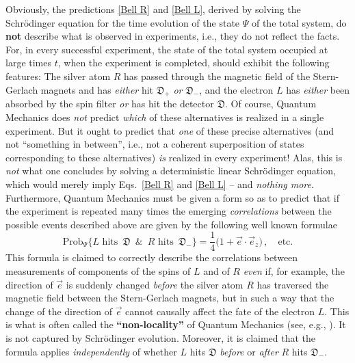 \documentclass[12pt]{article}
\begin{document}
{{Obviously}}, the predictions \eqref{Bell R} and \eqref{Bell L}, derived by solving the Schr\"odinger equation for
the time evolution of the state $\Psi$ of the total system, do {\bf{not}} describe what is observed in experiments, i.e.,
they do not reflect the facts. For, in every successful experiment, the state of the total system occupied at large times
$t$, when the experiment is completed, should exhibit the following features:
The silver atom $R$ has passed through the magnetic field of the Stern-Gerlach magnets and has \textit{either} hit
$\mathfrak{D}_{+}$ \textit{or} $\mathfrak{D}_{-}$, and the electron $L$ has \textit{either} been absorbed by the
spin filter \textit{or} has hit the detector $\mathfrak{D}$. Of course, Quantum Mechanics does \textit{not} predict \textit{which}
of these alternatives is realized in a single experiment. But it ought to predict that \textit{one} of these
precise alternatives (and not ``something in between'', i.e., not a coherent superposition of states corresponding
to these alternatives) \textit{is} realized in every experiment! Alas, this is \textit{not}
what one concludes by solving a deterministic linear Schr\"odinger equation, which would merely imply Eqs.~\eqref{Bell R}
and \eqref{Bell L} -- and \textit{nothing more}. Furthermore, Quantum Mechanics must be given a form so as to predict
that if the experiment is repeated many times the emerging \textit{correlations} between the possible events described above
are given by the following well known formulae
\begin{equation}\label{probability}
\text{Prob}_{\Psi}\big\{L \text{ hits }\, \mathfrak{D}\,\,\, \& \, \,\,R \text{ hits } \,\mathfrak{D}_{-} \big\} =
\frac{1}{4}\Big(1 + \vec{e}\cdot \vec{e}_z\Big)\,, \quad \text{etc.}
\end{equation}
This formula is claimed to correctly describe the correlations between measurements of components  of the spins of $L$
and of $R$ \textit{even} if, for example, the direction of $\vec{e}$ is suddenly changed \textit{before} the silver atom $R$
has traversed the magnetic field between the Stern-Gerlach magnets, but in such a way that the change of the direction
of $\vec{e}$ cannot causally affect the fate of the electron $L$. This is what is often called the {\bf{``non-locality''}} of
Quantum Mechanics (see, e.g., \cite{BGold}). It is not captured by Schr\"odinger evolution. Moreover, it is claimed that the formula applies
\textit{independently} of whether $L$ hits $\mathfrak{D}$ \textit{before} or \textit{after} $R$ hits $\mathfrak{D}_{-}$.
\end{document}
